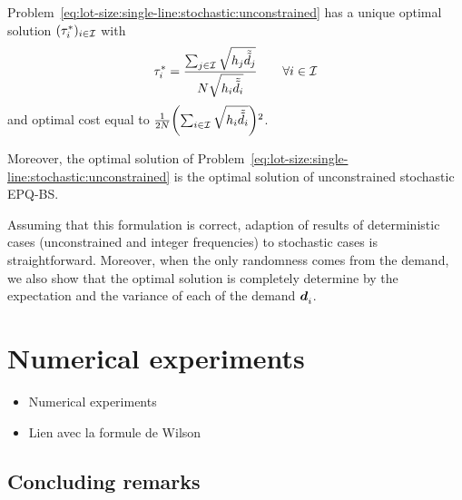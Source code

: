 \begin{thm}\label{thm:lot-size:single-line:stochastic:unconstrained:optimality}
Problem~\eqref{eq:lot-size:single-line:stochastic:unconstrained} has a unique optimal solution $(\tau_i^*)_{i\in\mathcal{I}}$ with
\begin{equation}
  \tau_i^*= \frac{\sum_{j\in\mathcal{I}}\sqrt{h_j\tilde{\tilde{d}}_j}}{N\sqrt{h_i\tilde{\tilde{d}}_i}}\qquad\forall i\in\mathcal{I}
\end{equation}
and optimal cost equal to $\frac{1}{2\nbsetups}\bracket{\sum_{i\in\REF}\sqrt{\holding_i\tilde{\tilde{\demand}}_i}}^2$.

Moreover, the optimal solution of Problem~\eqref{eq:lot-size:single-line:stochastic:unconstrained} is the optimal solution of unconstrained stochastic EPQ-BS.
\end{thm}


Assuming that this formulation is correct, adaption of results of deterministic cases (unconstrained and integer frequencies) to stochastic cases is straightforward.
Moreover, when the only randomness comes from the demand, we also show that the optimal solution is completely determine by the expectation and the variance of each of the demand $\va\demand_i$.





\section{Numerical experiments}

\begin{itemize}
  \item Numerical experiments
  \item Lien avec la formule de Wilson
\end{itemize}


\subsection{Concluding remarks}




